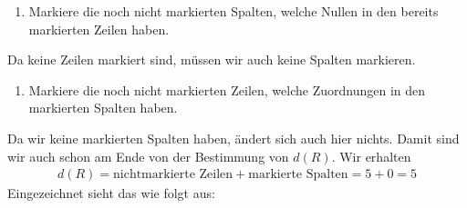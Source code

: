 \documentclass[
a4paper, %
11pt,
]
{scrartcl}
\begin{document}
\begin{enumerate}[(D3)]
  \item Markiere die noch nicht markierten Spalten, welche Nullen in den bereits
    markierten Zeilen haben.
\end{enumerate}

Da keine Zeilen markiert sind, müssen wir auch keine Spalten markieren.

\begin{enumerate}[(D4)]
  \item Markiere die noch nicht markierten Zeilen, welche Zuordnungen in den
    markierten Spalten haben.
\end{enumerate}
Da wir keine markierten Spalten haben, ändert sich auch hier nichts.
Damit sind wir auch schon am Ende von der Bestimmung von $d(R)$. Wir erhalten
\begin{align*}
  d(R) = \text{nichtmarkierte Zeilen} + \text{markierte Spalten} = 5 + 0 = 5
\end{align*}
Eingezeichnet sieht das wie folgt aus:
\end{document}
